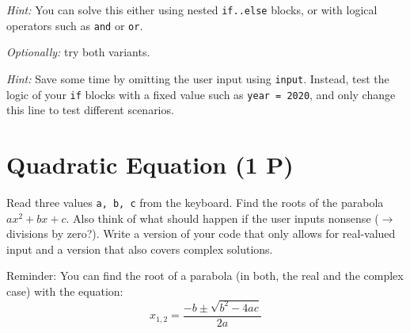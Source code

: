 \documentclass[
	english,
	fontsize=10pt,
	parskip=half,
	titlepage=true,
	DIV=12
]{scrartcl}
\newcommand*{\inPy}[1]{\texttt{#1}}
\begin{document}
\emph{Hint:} You can solve this either using nested \inPy{if..else} blocks, or with logical operators such as \inPy{and} or \inPy{or}.

\emph{Optionally:} try both variants.

\emph{Hint:} Save some time by omitting the user input using \inPy{input}. Instead, test the logic of your \inPy{if} blocks with a fixed value such as 
\inPy{year = 2020}, and only change this line to test different scenarios.

\section{Quadratic Equation (1 P)}
Read three values \inPy{a, b, c} from the keyboard. Find the roots of the parabola $ax^2 + bx +c$. Also think of what should happen if the user inputs nonsense ($\rightarrow$ divisions by zero?). Write a version of your code that only allows for real-valued input and a version that also covers complex solutions.

Reminder: You can find the root of a parabola (in both, the real and the complex case) with the equation:
\[ x_{1,2} = \frac{-b \pm \sqrt{b^2 - 4ac}}{2a} \]
\end{document}
